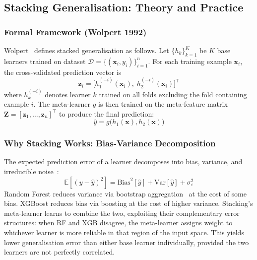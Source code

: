 \documentclass[conference]{IEEEtran}
\begin{document}
\subsection{Stacking Generalisation: Theory and Practice}
\label{sec:stacking_theory}

\subsubsection{Formal Framework (Wolpert 1992)}
Wolpert~\cite{wolpert1992} defines stacked generalisation as follows.
Let $\{h_k\}_{k=1}^{K}$ be $K$ base learners trained on dataset
$\mathcal{D} = \{(\mathbf{x}_i, y_i)\}_{i=1}^{n}$.
For each training example $\mathbf{x}_i$, the cross-validated prediction vector is
\begin{equation}
\label{eq:stacking_meta}
\mathbf{z}_i = \bigl[h_1^{(-i)}(\mathbf{x}_i),\; h_2^{(-i)}(\mathbf{x}_i)\bigr]^{\top}
\end{equation}
where $h_k^{(-i)}$ denotes learner $k$ trained on all folds excluding the fold containing
example $i$.
The meta-learner $g$ is then trained on the meta-feature matrix
$\mathbf{Z} = [\mathbf{z}_1, \ldots, \mathbf{z}_n]^{\top}$ to produce the final prediction:
\begin{equation}
\hat{y} = g\bigl(h_1(\mathbf{x}), h_2(\mathbf{x})\bigr)
\end{equation}

\subsubsection{Why Stacking Works: Bias-Variance Decomposition}
The expected prediction error of a learner decomposes into bias, variance, and irreducible
noise~\cite{geman1992}:
\begin{equation}
\mathbb{E}[(y - \hat{y})^2] = \text{Bias}^2[\hat{y}] + \text{Var}[\hat{y}] + \sigma^2_\varepsilon
\end{equation}
Random Forest reduces variance via bootstrap aggregation~\cite{breiman1996bagging} at the cost of some bias.
XGBoost reduces bias via boosting at the cost of higher variance.
Stacking's meta-learner learns to combine the two, exploiting their complementary
error structures: when RF and XGB disagree, the meta-learner assigns weight to whichever
learner is more reliable in that region of the input space.
This yields lower generalisation error than either base learner individually, provided
the two learners are not perfectly correlated.
\end{document}
